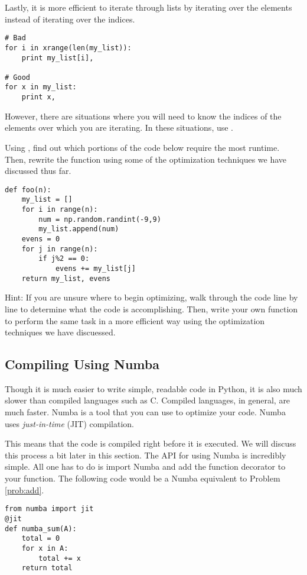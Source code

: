 Lastly, it is more efficient to iterate through lists by iterating over the elements instead of iterating over the indices.
\begin{lstlisting}
# Bad
for i in xrange(len(my_list)):
    print my_list[i],

# Good
for x in my_list:
    print x,
\end{lstlisting}

However, there are situations where you will need to know the indices of the elements over which you are iterating. In these situations, use .

\begin{problem}
Using , find out which portions of the code below require the most runtime. Then, rewrite the function using some of the optimization techniques we have discussed thus far.
\begin{lstlisting}
def foo(n):
    my_list = []
    for i in range(n):
        num = np.random.randint(-9,9)
        my_list.append(num)
    evens = 0
    for j in range(n):
        if j%2 == 0:
            evens += my_list[j]
    return my_list, evens
\end{lstlisting}

Hint: If you are unsure where to begin optimizing, walk through the code line by line to determine what the code is accomplishing. Then, write your own function to perform the same task in a more efficient way using the optimization techniques we have discuessed.
\end{problem}

\subsection*{Compiling Using Numba}
Though it is much easier to write simple, readable code in Python, it is also much slower than compiled languages such as C. Compiled languages, in general, are much faster.
Numba is a tool that you can use to optimize your code. Numba uses \emph{just-in-time} (JIT) compilation.

This means that the code is compiled right before it is executed. We will discuss this process a bit later in this section.
The API for using Numba is incredibly simple. All one has to do is import Numba and add the  function decorator to your function. The following code would be a Numba equivalent to Problem \ref{prob:add}.
\begin{lstlisting}
from numba import jit
@jit
def numba_sum(A):
    total = 0
    for x in A:
        total += x
    return total
\end{lstlisting}

